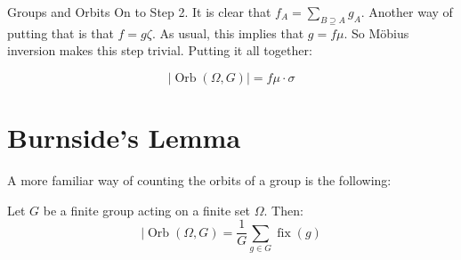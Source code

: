 \documentclass[12pt]{pom_thesis}
\DeclareMathOperator{\orb}{Orb}
\DeclareMathOperator{\fixx}{fix}
\begin{document}
\begin{chapter}{Groups and Orbits}
On to Step 2. It is clear that $f_A = \sum_{B \supseteq A} g_A$. Another way of putting that is that $f = g\zeta$. As usual, this implies that $g = f\mu$. So M\"obius inversion makes this step trivial. Putting it all together:

\[
|\orb(\Omega, G)| = f\mu \cdot \sigma
\]
\section{Burnside's Lemma}
A more familiar way of counting the orbits of a group is the following:
\begin{thm}\label{burnside}
Let $G$ be a finite group acting on a finite set $\Omega$. Then:
\[
|\orb(\Omega, G) = \frac{1}{G}\sum_{g \in G}\fixx(g)
\]
\end{thm}

\end{chapter}
\end{document}
